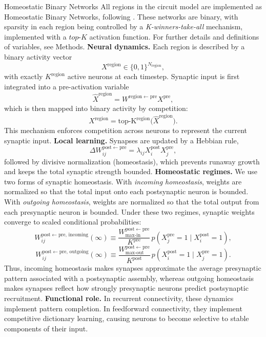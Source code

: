 \documentclass{article}
\begin{document}
\begin{technicalbox}{Homeostatic Binary Networks}
All regions in the circuit model are implemented as Homeostatic Binary Networks, following . These networks are binary, with sparsity in each region being controlled by a \textit{K-winners-take-all} mechanism, implemented with a $top$-$K$ activation function. For further details and definitions of variables, see Methods.
\newline\newline
\textbf{Neural dynamics.} Each region is described by a binary activity vector
\[
X^\mathrm{region}\in\{0,1\}^{N_\mathrm{region}},
\]
with exactly $K^\mathrm{region}$ active neurons at each timestep. Synaptic input is first integrated into a pre-activation variable
\[
\hat{X}^\mathrm{region}
=
W^{\mathrm{region}\leftarrow\mathrm{pre}}X^\mathrm{pre},
\]
which is then mapped into binary activity by competition:
\[
X^\mathrm{region}
=
\operatorname{top\text{-}K^\mathrm{region}}
\big(\hat{X}^\mathrm{region}\big).
\]
This mechanism enforces competition across neurons to represent the current synaptic input.
\newline\newline
\textbf{Local learning.} Synapses are updated by a Hebbian rule,
\[
\Delta W_{ij}^{\mathrm{post}\leftarrow\mathrm{pre}}
=
\lambda_{ij}X_i^\mathrm{post}X_j^\mathrm{pre},
\]
followed by divisive normalization (homeostasis), which prevents runaway growth and keeps the total synaptic strength bounded.
\newline\newline
\textbf{Homeostatic regimes.} We use two forms of synaptic homeostasis. With \textit{incoming homeostasis}, weights are normalized so that the total input onto each postsynaptic neuron is bounded. With \textit{outgoing homeostasis}, weights are normalized so that the total output from each presynaptic neuron is bounded. Under these two regimes, synaptic weights converge to scaled conditional probabilities:
\[
W_{ij}^{\mathrm{post}\leftarrow\mathrm{pre},\,\mathrm{incoming}}(\infty)
\equiv
\frac{W_{\mathrm{max\text{-}in}}^{\mathrm{post}\leftarrow\mathrm{pre}}}{K^\mathrm{pre}}
\,p(X_j^\mathrm{pre}=1\mid X_i^\mathrm{post}=1),
\]
\[
W_{ij}^{\mathrm{post}\leftarrow\mathrm{pre},\,\mathrm{outgoing}}(\infty)
\equiv
\frac{W_{\mathrm{max\text{-}out}}^{\mathrm{post}\leftarrow\mathrm{pre}}}{K^\mathrm{post}}
\,p(X_i^\mathrm{post}=1\mid X_j^\mathrm{pre}=1).
\]
Thus, incoming homeostasis makes synapses approximate the average presynaptic pattern associated with a postsynaptic assembly, whereas outgoing homeostasis makes synapses reflect how strongly presynaptic neurons predict postsynaptic recruitment.
\newline\newline
\textbf{Functional role.} In recurrent connectivity, these dynamics implement pattern completion. In feedforward connectivity, they implement competitive dictionary learning, causing neurons to become selective to stable components of their input.
\end{technicalbox}
\end{document}
